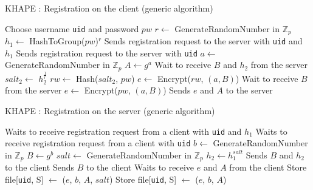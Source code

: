 ﻿\documentclass[../report.tex]{subfiles}
\begin{document}
\begin{algorithm}
\caption{KHAPE : Registration on the client (generic algorithm)}
\label{alg:register_client}
\begin{algorithmic}
\Require Choose username \verb|uid| and password $pw$
    \State $r \gets$ GenerateRandomNumber in $\mathbb{Z}_p$
    \State $h_1 \gets$ HashToGroup($pw$)$^r$
    \State Sends registration request to the server with \verb|uid| and $h_1$
\Else
    \State Sends registration request to the server with \verb|uid|
\EndIf
\State $a \gets$ GenerateRandomNumber in $\mathbb{Z}_p$
\State $A \gets g^a$
    \State Wait to receive $B$ and $h_2$ from the server
    \State $salt_2 \gets$ $h_2^{\frac{1}{r}}$
    \State $rw \gets$ Hash($salt_2$, $pw$)
    \State $e \gets$ Encrypt($rw$, $(a, B)$)
\Else
    \State Wait to receive $B$ from the server
    \State $e \gets$ Encrypt($pw$, $(a, B)$)
\EndIf
\State Sends $e$ and $A$ to the server
\end{algorithmic}
\end{algorithm}
\begin{algorithm}
\caption{KHAPE : Registration on the server (generic algorithm)}
\label{alg:register_server}
\begin{algorithmic}
\Require 
{}
    \State Waits to receive registration request from a client with \verb|uid| and $h_1$
\Else
    \State Waits to receive registration request from a client with \verb|uid|
\EndIf
\State $b \gets$ GenerateRandomNumber in $\mathbb{Z}_p$
\State $B \gets g^b$
    \State $salt \gets$ GenerateRandomNumber in $\mathbb{Z}_p$
    \State $h_2 \gets h_1^{salt}$    
    \State Sends $B$ and $h_2$ to the client
\Else
    \State Sends $B$ to the client
\EndIf
\State Waits to receive $e$ and $A$ from the client
    \State Store file[\verb|uid|, S] $\gets$ ($e$, $b$, $A$, $salt$) %
\Else
    \State Store file[\verb|uid|, S] $\gets$ ($e$, $b$, $A$) %
\EndIf
\end{algorithmic}
\end{algorithm}
\end{document}
